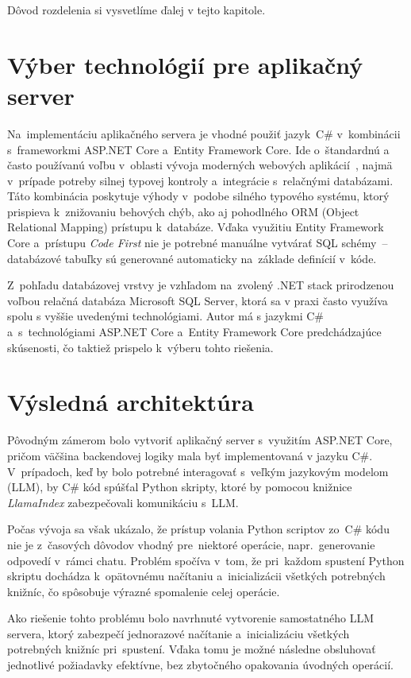 Dôvod rozdelenia si vysvetlíme ďalej v tejto kapitole.

\section{Výber technológií pre aplikačný server}

Na~implementáciu aplikačného servera je vhodné použiť jazyk~C\# v~kombinácii s~frameworkmi ASP.NET Core a~Entity Framework Core. Ide o~štandardnú a často používanú voľbu v~oblasti vývoja moderných webových aplikácií~\cite{top-backend-languages}, najmä v~prípade potreby silnej typovej kontroly a~integrácie s~relačnými databázami. Táto kombinácia poskytuje výhody v~podobe silného typového systému, ktorý prispieva k~znižovaniu behových chýb, ako aj pohodlného ORM (Object Relational Mapping) prístupu k~databáze. Vďaka využitiu Entity Framework Core a~prístupu \textit{Code First} nie je potrebné manuálne vytvárať SQL schémy~-- databázové tabuľky sú generované automaticky na~základe definícií v~kóde.

Z~pohľadu databázovej vrstvy je vzhľadom na~zvolený .NET stack prirodzenou voľbou relačná databáza Microsoft SQL Server, ktorá sa v praxi často využíva spolu s vyššie uvedenými technológiami. Autor má s jazykmi C\# a~s~technológiami ASP.NET Core a~Entity Framework Core predchádzajúce skúsenosti, čo taktiež prispelo k~výberu tohto riešenia.

\section{Výsledná architektúra}

Pôvodným zámerom bolo vytvoriť aplikačný server s~využitím ASP.NET Core, pričom väčšina backendovej logiky mala byť implementovaná v jazyku C\#. V~prípadoch, keď by bolo potrebné interagovať s~veľkým jazykovým modelom (LLM), by C\# kód spúšťal Python skripty, ktoré by pomocou knižnice \textit{LlamaIndex} zabezpečovali komunikáciu s~LLM.

Počas vývoja sa však ukázalo, že prístup volania Python scriptov zo~C\# kódu nie je z~časových dôvodov vhodný pre~niektoré operácie, napr.~generovanie odpovedí v~rámci chatu. Problém spočíva v~tom, že pri~každom spustení Python skriptu dochádza k~opätovnému načítaniu a~inicializácii všetkých potrebných knižníc, čo spôsobuje výrazné spomalenie celej operácie.

Ako riešenie tohto problému bolo navrhnuté vytvorenie samostatného LLM servera, ktorý zabezpečí jednorazové načítanie a~inicializáciu všetkých potrebných knižníc pri~spustení. Vďaka tomu je možné následne obsluhovať jednotlivé požiadavky efektívne, bez zbytočného opakovania úvodných operácií.
